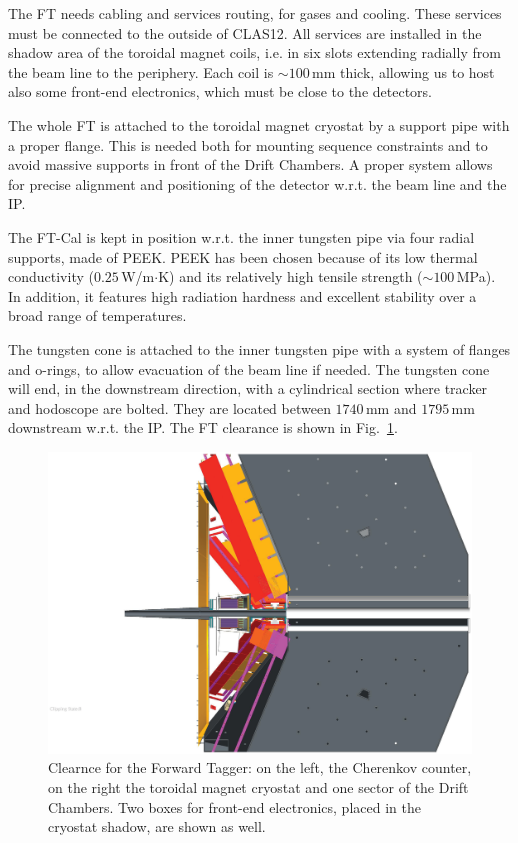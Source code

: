 The FT needs cabling and services routing, for gases and cooling. These services must be connected to the outside of CLAS12. All services are installed in the shadow area of the toroidal magnet coils, i.e. in six slots extending radially from the beam line to the periphery. Each coil is  $\sim100\,$mm thick, allowing us to host also some front-end electronics, which must be close to the detectors.

The whole FT is  attached to the toroidal magnet cryostat by a support pipe with a proper flange. This is needed both for mounting sequence constraints and to avoid massive supports in front of the Drift Chambers.  A proper system  allows for precise alignment and positioning of the detector w.r.t. the beam line and the IP.

 The FT-Cal is kept in position w.r.t. the inner tungsten pipe via four radial supports, made of PEEK. PEEK has been chosen because of its low thermal conductivity ($0.25\,$W/m$\cdot$K) and its relatively high tensile strength ($\sim100\,$MPa). In addition, it features high radiation hardness and excellent stability over a broad range of temperatures.

The tungsten cone is attached to the inner tungsten pipe with a system of flanges and o-rings, to allow evacuation of the beam line if needed. The tungsten cone will end, in the downstream direction, with a cylindrical section where  tracker and hodoscope are bolted. They are located between $1740\,$mm and $1795\,$mm downstream w.r.t. the IP. The FT clearance  is shown in Fig.~\ref{fig:integra}.

\begin{figure}
\includegraphics[width=1.0\columnwidth]{./fig/IC_integra.eps}
\caption{Clearnce for the Forward Tagger: on the left, the Cherenkov counter, on the right the toroidal magnet cryostat and one sector of the Drift Chambers. Two boxes for front-end electronics, placed in the cryostat shadow, are shown as well.}
\label{fig:integra}
\end{figure}







